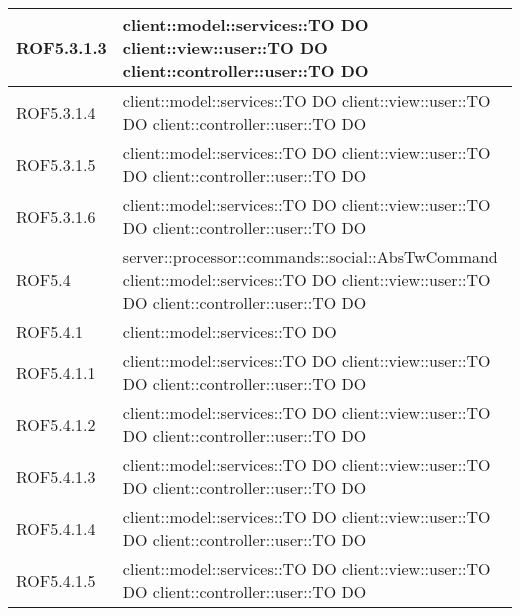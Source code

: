 \begin{center}
\begin{longtable}{| p{2.5cm} | p{11cm} |}
\hline
ROF5.3.1.3 & client::model::services::TO DO \newline client::view::user::TO DO \newline client::controller::user::TO DO \\
\hline
ROF5.3.1.4 & client::model::services::TO DO \newline client::view::user::TO DO \newline client::controller::user::TO DO \\
\hline
ROF5.3.1.5 & client::model::services::TO DO \newline client::view::user::TO DO \newline client::controller::user::TO DO \\
\hline
ROF5.3.1.6 & client::model::services::TO DO \newline client::view::user::TO DO \newline client::controller::user::TO DO \\
\hline
ROF5.4 & server::processor::commands::social::AbsTwCommand \newline client::model::services::TO DO \newline client::view::user::TO DO \newline client::controller::user::TO DO \\
\hline
ROF5.4.1 & client::model::services::TO DO \\
\hline
ROF5.4.1.1 & client::model::services::TO DO \newline client::view::user::TO DO \newline client::controller::user::TO DO \\
\hline
ROF5.4.1.2 & client::model::services::TO DO \newline client::view::user::TO DO \newline client::controller::user::TO DO \\
\hline
ROF5.4.1.3 & client::model::services::TO DO \newline client::view::user::TO DO \newline client::controller::user::TO DO \\
\hline
ROF5.4.1.4 & client::model::services::TO DO \newline client::view::user::TO DO \newline client::controller::user::TO DO \\
\hline
ROF5.4.1.5 & client::model::services::TO DO \newline client::view::user::TO DO \newline client::controller::user::TO DO \\

\end{longtable}
\end{center}
